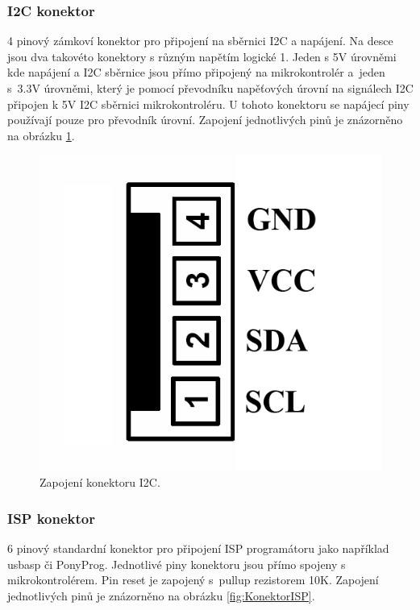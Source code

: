 \documentclass[a4paper,11pt]{article}
\begin{document}
\subsubsection{I2C konektor}
4 pinový zámkoví konektor pro připojení na sběrnici I2C a napájení. Na desce jsou dva takovéto konektory s různým napětím logické 1. Jeden s 5V úrovněmi kde napájení a I2C sběrnice jsou přímo připojený na mikrokontrolér a~jeden s~3.3V úrovněmi, který je pomocí převodníku napěťových úrovní na signálech I2C připojen k 5V I2C sběrnici mikrokontroléru. U tohoto konektoru se napájecí piny používají pouze pro převodník úrovní. Zapojení jednotlivých pinů je znázorněno na obrázku \ref{fig:KonektorI2C}.
	
\begin{figure}[htbp]
	\centering
		\includegraphics[scale=0.25]{KonektorI2C.png}
	\caption{Zapojení konektoru I2C.}
	\label{fig:KonektorI2C}
\end{figure}
	
\newpage	
\subsubsection{ISP konektor}
6 pinový standardní konektor pro připojení ISP programátoru jako například usbasp či PonyProg. Jednotlivé piny konektoru jsou přímo spojeny s mikrokontrolérem. Pin reset je zapojený s~pullup rezistorem 10K. Zapojení jednotlivých pinů je znázorněno na obrázku \ref{fig:KonektorISP}.
\end{document}
